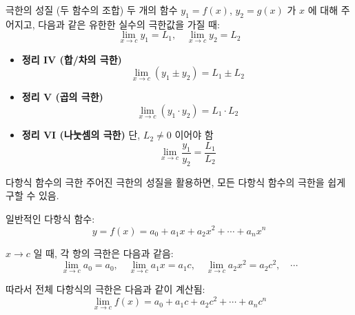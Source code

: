 \documentclass[aspectratio=169]{beamer}
\begin{document}
\begin{frame}{극한의 성질 (두 함수의 조합)}
  두 개의 함수 \( y_1 = f(x) \), \( y_2 = g(x) \) 가 \( x \) 에 대해 주어지고, 다음과 같은 유한한 실수의 극한값을 가질 때:
  \[
    \lim_{x \to c} y_1 = L_1, \quad \lim_{x \to c} y_2 = L_2
  \]
  

  \begin{itemize}
    \item \textbf{정리 IV (합/차의 극한)}
    \[
      \lim_{x \to c} (y_1 \pm y_2) = L_1 \pm L_2
    \]

    

    \item \textbf{정리 V (곱의 극한)}
    \[
      \lim_{x \to c} (y_1 \cdot y_2) = L_1 \cdot L_2
    \]



    \item \textbf{정리 VI (나눗셈의 극한)}  
    단, \( L_2 \ne 0 \) 이어야 함
    \[
      \lim_{x \to c} \frac{y_1}{y_2} = \frac{L_1}{L_2}
    \]
  \end{itemize}
\end{frame}

\begin{frame}{다항식 함수의 극한}
  주어진 극한의 성질을 활용하면, 모든 다항식 함수의 극한을 쉽게 구할 수 있음.

  \vspace{0.3cm}
  일반적인 다항식 함수:
  \[
    y = f(x) = a_0 + a_1x + a_2x^2 + \cdots + a_nx^n
  \]

  \( x \to c \) 일 때, 각 항의 극한은 다음과 같음:
  \[
    \lim_{x \to c} a_0 = a_0, \quad
    \lim_{x \to c} a_1x = a_1c, \quad
    \lim_{x \to c} a_2x^2 = a_2c^2, \quad \cdots
  \]

  \vspace{0.3cm}
  따라서 전체 다항식의 극한은 다음과 같이 계산됨:
  \[
    \lim_{x \to c} f(x) = a_0 + a_1c + a_2c^2 + \cdots + a_nc^n
  \]

\end{frame}
\end{document}
